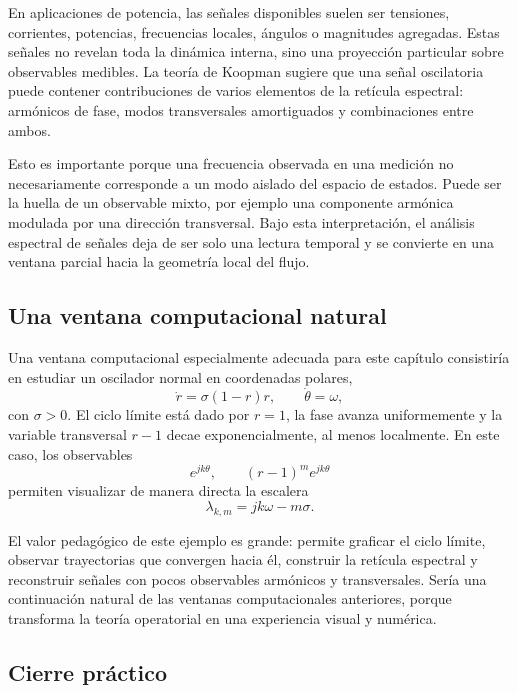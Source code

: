 En aplicaciones de potencia, las señales disponibles suelen ser tensiones, corrientes, potencias, frecuencias locales, ángulos o magnitudes agregadas. Estas señales no revelan toda la dinámica interna, sino una proyección particular sobre observables medibles. La teoría de Koopman sugiere que una señal oscilatoria puede contener contribuciones de varios elementos de la retícula espectral: armónicos de fase, modos transversales amortiguados y combinaciones entre ambos.

Esto es importante porque una frecuencia observada en una medición no necesariamente corresponde a un modo aislado del espacio de estados. Puede ser la huella de un observable mixto, por ejemplo una componente armónica modulada por una dirección transversal. Bajo esta interpretación, el análisis espectral de señales deja de ser solo una lectura temporal y se convierte en una ventana parcial hacia la geometría local del flujo.

\subsection{Una ventana computacional natural}

Una ventana computacional especialmente adecuada para este capítulo consistiría en estudiar un oscilador normal en coordenadas polares,
\begin{equation}
\dot{r}=\sigma(1-r)r,
\qquad
\dot{\theta}=\omega,
\label{eq:Koopman_computational_window_normal_form}
\end{equation}
con \(\sigma>0\). El ciclo límite está dado por \(r=1\), la fase avanza uniformemente y la variable transversal \(r-1\) decae exponencialmente, al menos localmente. En este caso, los observables
\[
e^{jk\theta},
\qquad
(r-1)^m e^{jk\theta}
\]
permiten visualizar de manera directa la escalera
\[
\lambda_{k,m}=jk\omega-m\sigma.
\]

El valor pedagógico de este ejemplo es grande: permite graficar el ciclo límite, observar trayectorias que convergen hacia él, construir la retícula espectral y reconstruir señales con pocos observables armónicos y transversales. Sería una continuación natural de las ventanas computacionales anteriores, porque transforma la teoría operatorial en una experiencia visual y numérica.

\subsection{Cierre práctico}

